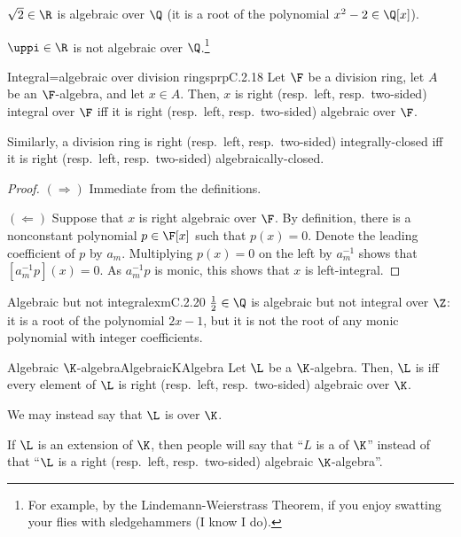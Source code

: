 \begin{exm}{}{}
	$\sqrt{2}\in \R$ is algebraic over $\Q$ (it is a root of the polynomial $x^2-2\in \Q [x]$).
	
	$\uppi \in \R$ is not algebraic over $\Q$.\footnote{For example, by the Lindemann-Weierstrass Theorem, if you enjoy swatting your flies with sledgehammers (I know I do).}
\end{exm}
\begin{prp}{Integral=algebraic over division rings}{prpC.2.18}
	Let $\F$ be a division ring, let $A$ be an $\F$-algebra, and let $x\in A$.  Then, $x$ is right (resp.~left, resp.~two-sided) integral over $\F$ iff it is right (resp.~left, resp.~two-sided) algebraic over $\F$.
	\begin{rmk}
		Similarly, a division ring is right (resp.~left, resp.~two-sided) integrally-closed iff it is right (resp.~left, resp.~two-sided) algebraically-closed.
	\end{rmk}
	\begin{proof}
		$(\Rightarrow )$ Immediate from the definitions.
		
		\blni
		$(\Leftarrow )$ Suppose that $x$ is right algebraic over $\F$.  By definition, there is a nonconstant polynomial $p\in \F [x]$ such that $p(x)=0$.  Denote the leading coefficient of $p$ by $a_m$.  Multiplying $p(x)=0$ on the left by $a_m^{-1}$ shows that $[a_m^{-1}p](x)=0$.  As $a_m^{-1}p$ is monic, this shows that $x$ is left-integral.
	\end{proof}
\end{prp}
\begin{exm}{Algebraic but not integral}{exmC.2.20}
	$\frac{1}{2}\in \Q$ is algebraic but not integral over $\Z$:  it is a root of the polynomial $2x-1$, but it is not the root of any monic polynomial with integer coefficients.
\end{exm}
\begin{dfn}{Algebraic $\K$-algebra}{AlgebraicKAlgebra}
	Let $\L$ be a $\K$-algebra.  Then, $\L$ is  iff every element of $\L$ is right (resp.~left, resp.~two-sided) algebraic over $\K$.
	\begin{rmk}
		We may instead say that $\L$ is  over $\K$.
	\end{rmk}
	\begin{rmk}
		If $\L$ is an extension of $\K$, then people will say that ``$L$ is a  of $\K$'' instead of that ``$\L$ is a right (resp.~left, resp.~two-sided) algebraic $\K$-algebra''.
	\end{rmk}
\end{dfn}
